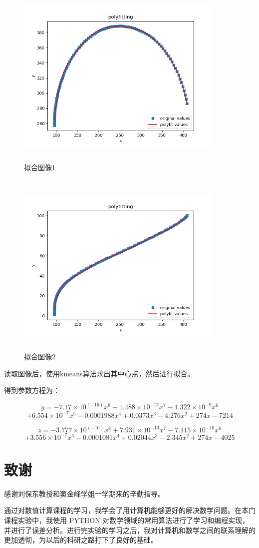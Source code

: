 \documentclass[UTF8]{ctexart}
\begin{document}
\begin{figure}[H]
 \centering
  \includegraphics[width=10cm,height=9cm]{2001_4.png}
  \caption{拟合图像1}
\end{figure}
\begin{figure}[H]
 \centering
  \includegraphics[width=10cm,height=9cm]{2001_5.png}
  \caption{拟合图像2}
\end{figure}


读取图像后，使用kmeans算法求出其中心点，然后进行拟合。


得到参数方程为：

$$
y=-7.17 \times 10^{(-16)} x^8 +1.488 \times10^{-12} x^7-1.322\times 10^{-9} x^6
$$
$$
+6.554 \times 10^{-7} x^5 -0.0001988 x^4 +0.0373 x^3-4.276 x^2+274x-7214
$$

$$
z=-3.777 \times 10^{(-16)} x^8 +7.931 \times10^{-13} x^7-7.115\times 10^{-10} x^6
$$
$$
+3.556\times 10^{-7} x^5 -0.0001081 x^4 +0.02044 x^3-2.345 x^2+274x-4025
$$

\newpage
\section*{致谢}
感谢刘保东教授和窦金峰学姐一学期来的辛勤指导。

通过对数值计算课程的学习，我学会了用计算机能够更好的解决数学问题。在本门课程实验中，我使用 PYTHON 对数学领域的常用算法进行了学习和编程实现，并进行了误差分析。进行完实验的学习之后，我对计算机和数学之间的联系理解的更加透彻，为以后的科研之路打下了良好的基础。
\end{document}
